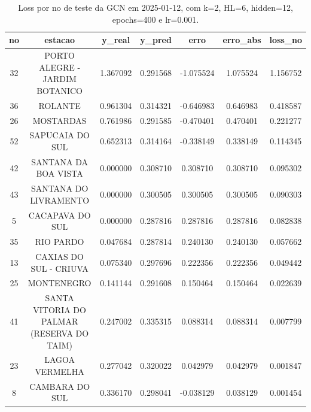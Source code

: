 \begin{table}[h]
\centering
\caption{Loss por no de teste da GCN em 2025-01-12, com k=2, HL=6, hidden=12, epochs=400 e lr=0.001.}
\label{tab:gcn_loss_k2_hl6_h12_e400_d20250112}
\begin{tabular}{ccccccc}
\toprule
no & estacao & y\_real & y\_pred & erro & erro\_abs & loss\_no \\
\midrule
32 & PORTO ALEGRE - JARDIM BOTANICO & 1.367092 & 0.291568 & -1.075524 & 1.075524 & 1.156752 \\
36 & ROLANTE & 0.961304 & 0.314321 & -0.646983 & 0.646983 & 0.418587 \\
26 & MOSTARDAS & 0.761986 & 0.291585 & -0.470401 & 0.470401 & 0.221277 \\
52 & SAPUCAIA DO SUL & 0.652313 & 0.314164 & -0.338149 & 0.338149 & 0.114345 \\
42 & SANTANA DA BOA VISTA & 0.000000 & 0.308710 & 0.308710 & 0.308710 & 0.095302 \\
43 & SANTANA DO LIVRAMENTO & 0.000000 & 0.300505 & 0.300505 & 0.300505 & 0.090303 \\
5 & CACAPAVA DO SUL & 0.000000 & 0.287816 & 0.287816 & 0.287816 & 0.082838 \\
35 & RIO PARDO & 0.047684 & 0.287814 & 0.240130 & 0.240130 & 0.057662 \\
13 & CAXIAS DO SUL - CRIUVA & 0.075340 & 0.297696 & 0.222356 & 0.222356 & 0.049442 \\
25 & MONTENEGRO & 0.141144 & 0.291608 & 0.150464 & 0.150464 & 0.022639 \\
41 & SANTA VITORIA DO PALMAR (RESERVA DO TAIM) & 0.247002 & 0.335315 & 0.088314 & 0.088314 & 0.007799 \\
23 & LAGOA VERMELHA & 0.277042 & 0.320022 & 0.042979 & 0.042979 & 0.001847 \\
8 & CAMBARA DO SUL & 0.336170 & 0.298041 & -0.038129 & 0.038129 & 0.001454 \\
\bottomrule
\end{tabular}
\end{table}
